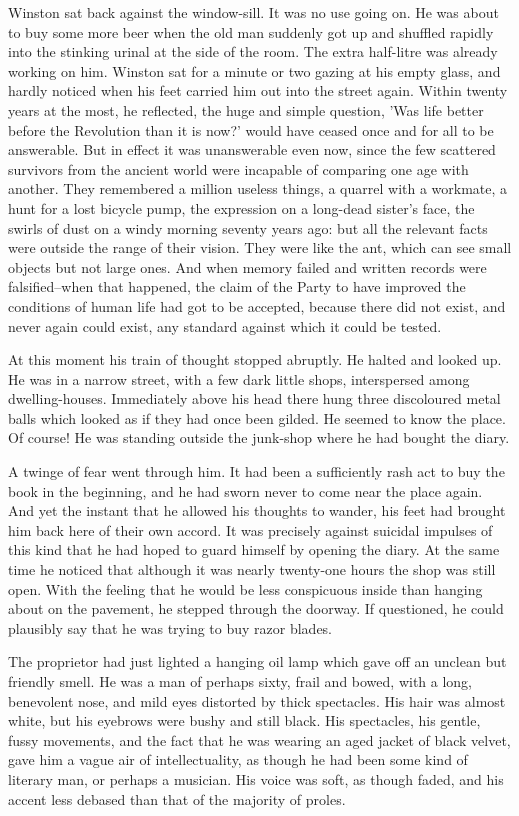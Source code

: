 \documentclass{article}
\begin{document}
Winston sat back against the window-sill. It was no use going on. He was
about to buy some more beer when the old man suddenly got up and shuffled
rapidly into the stinking urinal at the side of the room. The extra
half-litre was already working on him. Winston sat for a minute or two
gazing at his empty glass, and hardly noticed when his feet carried him out
into the street again. Within twenty years at the most, he reflected, the
huge and simple question, 'Was life better before the Revolution than it
is now?' would have ceased once and for all to be answerable. But in effect
it was unanswerable even now, since the few scattered survivors from the
ancient world were incapable of comparing one age with another. They
remembered a million useless things, a quarrel with a workmate, a hunt for
a lost bicycle pump, the expression on a long-dead sister's face, the
swirls of dust on a windy morning seventy years ago: but all the relevant
facts were outside the range of their vision. They were like the ant,
which can see small objects but not large ones. And when memory failed and
written records were falsified--when that happened, the claim of the Party
to have improved the conditions of human life had got to be accepted,
because there did not exist, and never again could exist, any standard
against which it could be tested.

At this moment his train of thought stopped abruptly. He halted and looked
up. He was in a narrow street, with a few dark little shops, interspersed
among dwelling-houses. Immediately above his head there hung three
discoloured metal balls which looked as if they had once been gilded. He
seemed to know the place. Of course! He was standing outside the junk-shop
where he had bought the diary.

A twinge of fear went through him. It had been a sufficiently rash act to
buy the book in the beginning, and he had sworn never to come near the
place again. And yet the instant that he allowed his thoughts to wander,
his feet had brought him back here of their own accord. It was precisely
against suicidal impulses of this kind that he had hoped to guard himself
by opening the diary. At the same time he noticed that although it was
nearly twenty-one hours the shop was still open. With the feeling that he
would be less conspicuous inside than hanging about on the pavement, he
stepped through the doorway. If questioned, he could plausibly say that
he was trying to buy razor blades.

The proprietor had just lighted a hanging oil lamp which gave off an
unclean but friendly smell. He was a man of perhaps sixty, frail and
bowed, with a long, benevolent nose, and mild eyes distorted by thick
spectacles. His hair was almost white, but his eyebrows were bushy and
still black. His spectacles, his gentle, fussy movements, and the fact
that he was wearing an aged jacket of black velvet, gave him a vague air
of intellectuality, as though he had been some kind of literary man, or
perhaps a musician. His voice was soft, as though faded, and his accent
less debased than that of the majority of proles.
\end{document}
